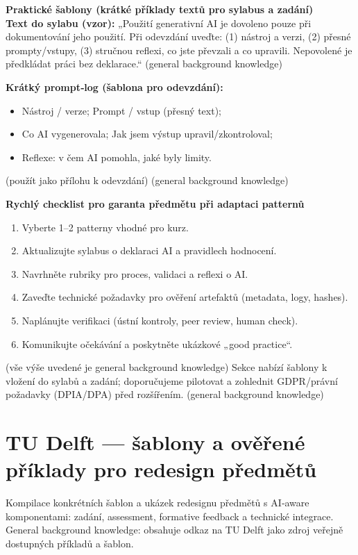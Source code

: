 \documentclass{report}%
\begin{document}
\medskip
\textbf{Praktické šablony (krátké příklady textů pro sylabus a zadání)}\\
\textbf{Text do sylabu (vzor):} „Použití generativní AI je dovoleno pouze při dokumentování jeho použití. Při odevzdání uveďte: (1) nástroj a verzi, (2) přesné prompty/vstupy, (3) stručnou reflexi, co jste převzali a co upravili. Nepovolené je předkládat práci bez deklarace.“ (general background knowledge)

\textbf{Krátký prompt‑log (šablona pro odevzdání):}
\begin{itemize}
  \item Nástroj / verze; Prompt / vstup (přesný text);
  \item Co AI vygenerovala; Jak jsem výstup upravil/zkontroloval;
  \item Reflexe: v čem AI pomohla, jaké byly limity.
\end{itemize}
(použít jako přílohu k odevzdání) (general background knowledge)

\medskip
\textbf{Rychlý checklist pro garanta předmětu při adaptaci patternů}
\begin{enumerate}
  \item Vyberte 1–2 patterny vhodné pro kurz.
  \item Aktualizujte sylabus o deklaraci AI a pravidlech hodnocení.
  \item Navrhněte rubriky pro proces, validaci a reflexi o AI.
  \item Zaveďte technické požadavky pro ověření artefaktů (metadata, logy, hashes).
  \item Naplánujte verifikaci (ústní kontroly, peer review, human check).
  \item Komunikujte očekávání a poskytněte ukázkové „good practice“.
\end{enumerate}
(vše výše uvedené je general background knowledge) Sekce nabízí šablony k vložení do sylabů a zadání; doporučujeme pilotovat a zohlednit GDPR/právní požadavky (DPIA/DPA) před rozšířením. (general background knowledge)%

%
\section{TU Delft — šablony a ověřené příklady pro redesign předmětů}%
Kompilace konkrétních šablon a ukázek redesignu předmětů s AI‑aware komponentami: zadání, assessment, formative feedback a technické integrace. General background knowledge: obsahuje odkaz na TU Delft jako zdroj veřejně dostupných příkladů a šablon.%
\end{document}
